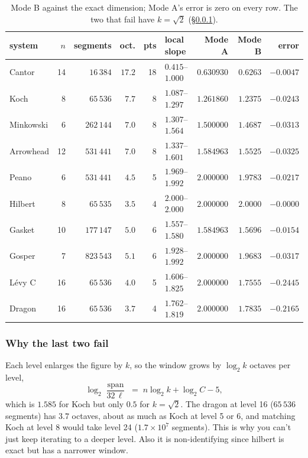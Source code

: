 \documentclass[11pt, a4paper]{article}
\theoremstyle{plain}
\theoremstyle{definition}
\theoremstyle{remark}
\begin{document}
\begin{table}[H]
\centering
\begin{tabular}{lrrrrlrrr}
\hline
system & $n$ & segments & oct. & pts & local slope & Mode A & Mode B & error \\
\hline
Cantor    & 14 & $16\,384$  & $17.2$ & 18 & $0.415$--$1.000$ & $0.630930$ & $0.6263$ & $-0.0047$ \\
Koch      &  8 & $65\,536$  & $7.7$  &  8 & $1.087$--$1.297$ & $1.261860$ & $1.2375$ & $-0.0243$ \\
Minkowski &  6 & $262\,144$ & $7.0$  &  8 & $1.307$--$1.564$ & $1.500000$ & $1.4687$ & $-0.0313$ \\
Arrowhead & 12 & $531\,441$ & $7.0$  &  8 & $1.337$--$1.601$ & $1.584963$ & $1.5525$ & $-0.0325$ \\
Peano     &  6 & $531\,441$ & $4.5$  &  5 & $1.969$--$1.992$ & $2.000000$ & $1.9783$ & $-0.0217$ \\
Hilbert   &  8 & $65\,535$  & $3.5$  &  4 & $2.000$--$2.000$ & $2.000000$ & $2.0000$ & $-0.0000$ \\
\hline
Gasket    & 10 & $177\,147$ & $5.0$  &  6 & $1.557$--$1.580$ & $1.584963$ & $1.5696$ & $-0.0154$ \\
Gosper    &  7 & $823\,543$ & $5.1$  &  6 & $1.928$--$1.992$ & $2.000000$ & $1.9683$ & $-0.0317$ \\
L\'evy C  & 16 & $65\,536$  & $4.0$  &  5 & $1.606$--$1.825$ & $2.000000$ & $1.7555$ & $-0.2445$ \\
Dragon    & 16 & $65\,536$  & $3.7$  &  4 & $1.762$--$1.819$ & $2.000000$ & $1.7835$ & $-0.2165$ \\
\hline
\end{tabular}
\caption{Mode B against the exact dimension; Mode A's error is zero on every row. 
The two that fail have $k=\sqrt2$ (\S\ref{sec:failures}).}
\label{tab:estimates}
\end{table}

\subsubsection{Why the last two fail}
\label{sec:failures}

Each level enlarges the figure by $k$, so the window grows by $\log_2 k$
octaves per level,
\[
  \log_2\!\frac{\operatorname{span}}{32\,\ell}
  \;=\; n\log_2k+\log_2C-5,
\]
which is $1.585$ for Koch but only $0.5$ for $k=\sqrt2$. The dragon at level 16
($65\,536$ segments) has $3.7$ octaves, about as much as Koch at level 5 or 6,
and matching Koch at level 8 would take level 24 ($1.7\times10^7$ segments).
This is why you can't just keep iterating to a deeper level. 
Also it is non-identifying since hilbert is exact but has a narrower window.
\end{document}
